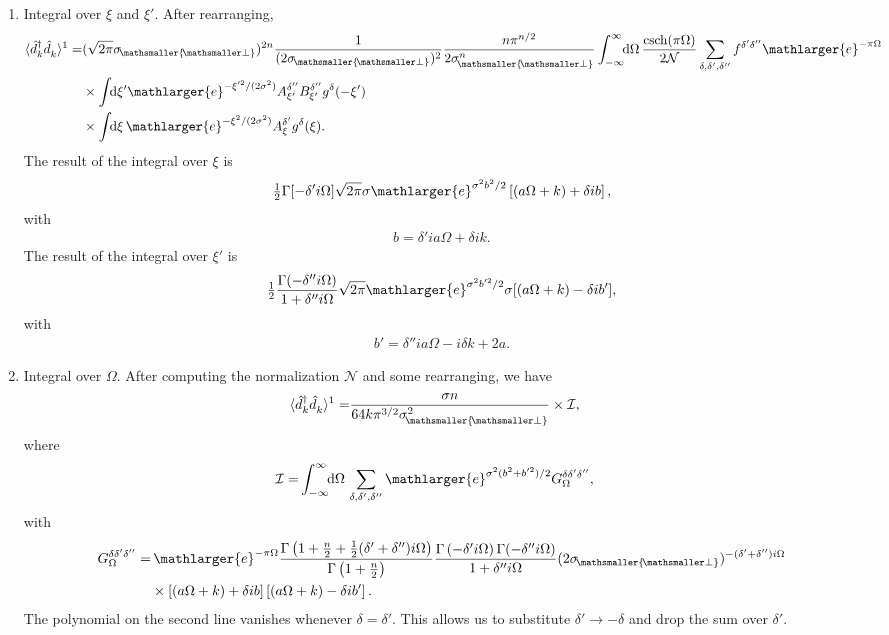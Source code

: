 \documentclass[11pt, a4paper]{article}
\newcommand{\Om}{\Omega}
\newcommand{\si}{{\sigma}}
\newcommand{\mc}[1]{\mathcal{#1}}
\newcommand{\sfrac}[2]{{\textstyle\frac{#1}{#2}}}
\newcommand{\half}{\sfrac{1}{2}}
\newcommand{\integral}{\int\!\! \mathrm{d}}
\newcommand{\csch}{\mathrm{csch}}
\let\perptmp\perp
\renewcommand{\perp}{{\! \mathsmaller{\perptmp}}}
\newcommand{\e}{\mathlarger{e}}
\newcommand{\nodagger}{{\phantom{\dagger}}}
\newcommand{\ddd}{\langle \hat d_k^\dagger \hat d^\nodagger_k \rangle}
\begin{document}
\begin{enumerate}
\item Integral over  $\xi$ and $\xi'$. After rearranging,
\begin{align*}
\ddd^1=&
(\sqrt{2\pi}\si_\perp)^{2n}\frac{1}{(2\si_\perp)^{2}}\frac{n\pi^{n/2}}{2\si_\perp^n}\int_{-\infty}^{\infty}\!\!\mathrm{d}\Om \,\frac{\csch(\pi\Om) }{2\mc N}
\sum_{\delta,\delta',\delta''}
f^{\delta'\delta''} \e^{-\pi\Om} \\
&\times \integral \xi' \e^{-\xi'^2/(2\si ^2)}A^{\delta''}_{\xi'}B^{\delta''}_{\xi'}g^\delta(-\xi') \\
&\times \integral \xi\,\e^{-\xi^2/(2\si ^2)}A^{\delta'}_{\xi}g^\delta(\xi).
\end{align*}
The result of the integral over $\xi$ is
\begin{align*}
\half \Gamma[-\delta'i\Om]\sqrt{2\pi}\si  \e^{\si ^2 b^2/2}\left[( a\Om+k)+\delta i b\right],
\end{align*}
with 
\begin{align}\label{eq:calcb}
b=\delta'i a\Om+\delta i k.
\end{align}
The result of the integral over $\xi'$ is
\begin{align*}
\half \frac{\Gamma(-\delta''i\Om)}{1+\delta''i\Om}\sqrt{2\pi}\e^{\si ^2b'^2/2}\si [(a\Om+k)-\delta i b'],
\end{align*}
with
\begin{align}
\label{eq:calcbPrime}
b'=\delta''i a\Om-i\delta k +2a.
\end{align}

\item Integral over $\Om$. After computing the normalization $\mc N$ and some rearranging, we have
\begin{align}
\label{eq:calcExValOfNumberOpWithMcI}
\ddd^1=&\frac{\si  n}{64 k \pi^{3/2}\si_\perp^2}\times \mathcal I,
\end{align}
where
\begin{align}
\label{eq:calcMcI}
\mathcal I=&\int_{-\infty}^{\infty}\!\!\mathrm{d} \Om\,\sum_{\delta,\delta',\delta''} \e^{\si ^2(b^2+b'^2)/2}G_\Om^{\delta\delta'\delta''},
\end{align}
with
\begin{align*}
G_\Om^{\delta\delta'\delta''}=&\,\e^{- \pi \Om}
\frac{\Gamma\left(1+\sfrac{n}{2}+\half (\delta'+\delta'')i\Om\right)}{\Gamma\left(1+\sfrac{n}{2}\right)}
\frac{\Gamma\left(-\delta'i\Om\right)\Gamma(-\delta''i\Om)}{1+\delta''i\Om}(2\si_\perp)^{-(\delta'+\delta'')i\Om}\\
&\times \left[(a \Om+k)+\delta i b\right]\left[(a \Om+k)-\delta i b'\right].
\end{align*}
The polynomial on the second line vanishes whenever 
$\delta=\delta'$.  This allows us to substitute $\delta'\to-\delta$ and drop  the sum over $\delta'$. 


\end{enumerate}
\end{document}
